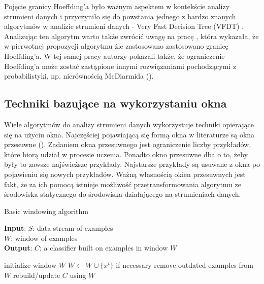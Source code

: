 Pojęcie granicy Hoeffding'a było ważnym aspektem w kontekście analizy strumieni danych i przyczyniło się do powstania jednego z bardzo znanych algorytmów w analizie strumieni danych - Very Fast Decision Tree (VFDT) \cite{Article:VFDT}. Analizując ten algorytm warto także zwrócić uwagę na pracę \cite{Article:Rutkowski}, która wykazała, że w pierwotnej propozycji algorytmu źle zastosowano zastosowano granicę Hoeffding'a. W tej samej pracy autorzy pokazali także, że ograniczenie Hoeffding'a może zostać zastąpione innymi rozwiązaniami pochodzącymi z probabilistyki, np. nierównością McDiarmida ().

\subsection{Techniki bazujące na wykorzystaniu okna}

\noindent Wiele algorytmów do analizy strumieni danych wykorzystuje techniki opierające się na użyciu okna. Najczęściej pojawiającą się formą okna w literaturze są okna przesuwne (). Zadaniem okna przesuwnego jest ograniczenie liczby przykładów, które biorą udział w procesie uczenia. Ponadto okno przesuwne dba o to, żeby były to zawsze najświeższe przykłady. Najstarsze przykłady są usuwane z okna po pojawieniu się nowych przykładów. Ważną własnością okien przesuwnych jest fakt, że za ich pomocą istnieje możliwość przetransformowania algorytmu ze środowiska statycznego do środowiska działającego na strumieniach danych.

\begin{algorithm}
    \caption{Basic windowing algorithm \cite{BrzezPhd2015}}\label{Algorithm:Window}
    \textbf{Input}: $S$: data stream of examples \\
    \hspace*{12mm} $W$: window of examples \\
    \textbf{Output}: $C$: a classifier built on examples in window $W$ \\
    \begin{algorithmic}[1]
    \State initialize window $W$
    \State $W \gets W \cup \{x^t\}$
    \State if necessary remove outdated examples from $W$
    \State rebuild/update $C$ using $W$
    \EndFor
    \end{algorithmic}
\end{algorithm}

